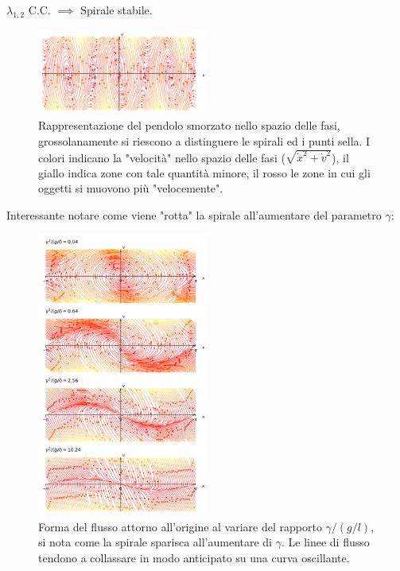 \begin{exmp}
\begin{itemize}
\begin{itemize}
		    $\lambda_{1,2} $ C.C. $\implies$ Spirale stabile.
	    \end{itemize}
    \end{itemize}
    \begin{figure}[H]
        \centering
	\includegraphics[width=0.5\textwidth]{figures/15_pendolo.png}
	\caption{\scriptsize Rappresentazione del pendolo smorzato nello spazio delle fasi, grossolanamente si riescono a distinguere le spirali ed i punti sella. I colori indicano la "velocità" nello spazio delle fasi ($\sqrt{\dot{x}^2+\dot{v}^2}$), il giallo indica zone con tale quantità minore, il rosso le zone in cui gli oggetti si muovono più "velocemente".}
        \label{fig:fig}
    \end{figure}
    Interessante notare come viene "rotta" la spirale all'aumentare del parametro $\gamma$:
    \begin{figure}[H]
        \centering
	\includegraphics[width=0.5\textwidth]{figures/15_pendolo_accartoccio.png}
	\caption{\scriptsize Forma del flusso attorno all'origine al variare del rapporto $\gamma  / (g /l)$, si nota come la spirale sparisca all'aumentare di $\gamma$. Le linee di flusso tendono a collassare in modo anticipato su una curva oscillante.}
        \label{fig:figures-15_pendolo_accartoccio-png}
    \end{figure}
\end{exmp}
